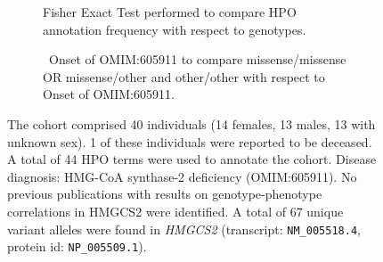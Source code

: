 \begin{figure}[htbp]
\begin{subfigure}[b]{0.95\textwidth}
\centering
{}
\captionsetup{justification=raggedright,singlelinecheck=false}
\caption{Fisher Exact Test performed to compare HPO annotation frequency with respect to genotypes. }
\end{subfigure}

\vspace{2em}

\begin{subfigure}[b]{0.95\textwidth}
\captionsetup{justification=raggedright,singlelinecheck=false}
\caption{ Onset of OMIM:605911 to compare missense/missense OR missense/other and other/other with respect to Onset of OMIM:605911. }
\end{subfigure}

\vspace{2em}

\caption{The cohort comprised 40 individuals (14 females, 13 males, 13 with unknown sex). 1 of these individuals were reported to be deceased. A total of 44 HPO terms were used to annotate the cohort. Disease diagnosis: HMG-CoA synthase-2 deficiency (OMIM:605911). No previous publications with results on genotype-phenotype correlations in HMGCS2 were identified. A total of 67 unique variant alleles were found in \textit{HMGCS2} (transcript: \texttt{NM\_005518.4}, protein id: \texttt{NP\_005509.1}).}
\end{figure}
